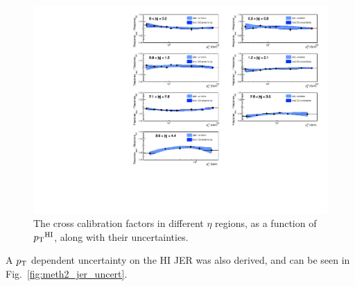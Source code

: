 \begin{figure}
	\centering
	\includegraphics[width=1.0\textwidth]{figures/qualification/factors_w_uncertainties}
	\caption{The cross calibration factors in different $\eta$ regions, as a function of $\mbox{$p_{\mathrm{T}}$}^{\mathrm{HI}}$, along with their uncertainties.}
	\label{fig:factors_w_uncertainties}%
\end{figure}

 A $\mbox{$p_{\mathrm{T}}$}$ dependent uncertainty on the HI JER was also derived, and can be seen in Fig.~\ref{fig:meth2_jer_uncert}.



